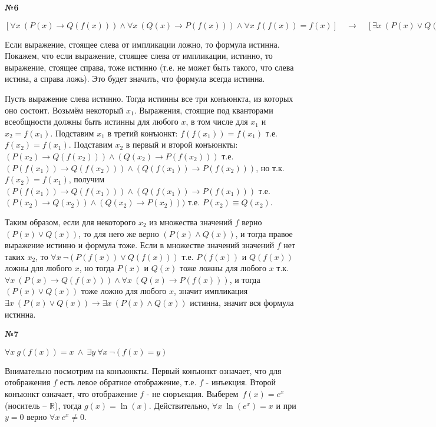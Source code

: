 \documentclass{article}
\newenvironment{task}{\begin{center}\fontsize{14}{14}\selectfont\bf}{\rm\fontsize{12}{12}\selectfont\end{center}}
\begin{document}
	
			
	\begin{task} 
		№6
	\end{task}
	\begin{center}
		$\left[ \forall x\ (P(x) \rightarrow Q(f(x))) \wedge \forall x\ (Q(x) \rightarrow P(f(x))) \wedge \forall x\ f(f(x)) = f(x) \right] \quad \rightarrow \quad \left[ \exists x\ (P(x) \vee Q(x)) \rightarrow \exists x\ (P(x) \wedge Q(x)) \right]$
	\end{center}

	Если выражение, стоящее слева от импликации ложно, то формула истинна. Покажем, что если выражение, стоящее слева от импликации, истинно, то выражение, стоящее справа, тоже истинно (т.е. не может быть такого, что слева истина, а справа ложь). Это будет значить, что формула всегда истинна.
	
	Пусть выражение слева истинно. Тогда истинны все три конъюнкта, из которых оно состоит. Возьмём некоторый $x_1$. Выражения, стоящие под кванторами всеобщности должны быть истинны для любого $x$, в том числе для $x_1$ и $x_2 = f(x_1)$. Подставим $x_1$ в третий конъюнкт: $f(f(x_1)) = f(x_1)$ т.е. $f(x_2) = f(x_1)$. Подставим $x_2$ в первый и второй конъюнкты:
	$(P(x_2) \rightarrow Q(f(x_2))) \wedge (Q(x_2) \rightarrow P(f(x_2)))$ т.е. $(P(f(x_1)) \rightarrow Q(f(x_2))) \wedge (Q(f(x_1)) \rightarrow P(f(x_2)))$, но т.к. $f(x_2) = f(x_1)$, получим $(P(f(x_1)) \rightarrow Q(f(x_1))) \wedge (Q(f(x_1)) \rightarrow P(f(x_1)))$ т.е. $(P(x_2) \rightarrow Q(x_2)) \wedge (Q(x_2) \rightarrow P(x_2)))$ т.е. $P(x_2) \equiv Q(x_2)$.
	
	Таким образом, если для некоторого $x_2$ из множества значений $f$ верно $(P(x) \vee Q(x))$, то для него же верно $(P(x) \wedge Q(x))$, и тогда правое выражение истинно и формула тоже. Если в множестве значений значений $f$ нет таких $x_2$, то $\forall x\ \neg (P(f(x)) \vee Q(f(x)))$ т.е. $P(f(x))$ и $Q(f(x))$ ложны для любого $x$, но тогда $P(x)$ и $Q(x)$ тоже ложны для любого $x$ т.к. $\forall x\ (P(x) \rightarrow Q(f(x))) \wedge \forall x\ (Q(x) \rightarrow P(f(x)))$, и тогда $(P(x) \vee Q(x))$ тоже ложно для любого $x$, значит импликация $\exists x\ (P(x) \vee Q(x)) \rightarrow \exists x\ (P(x) \wedge Q(x))$ истинна, значит вся формула истинна.
	


	\begin{task} 
		№7
	\end{task}
	\begin{center}
		$\forall x\ g(f(x)) = x\ \wedge \ \exists y\ \forall x\ \neg(f(x) = y)$
	\end{center}
	Внимательно посмотрим на конъюнкты. Первый конъюнкт означает, что для отображения $f$ есть левое обратное отображение, т.е. $f$ - инъекция. Второй конъюнкт означает, что отображение $f$ - не сюръекция. Выберем\ $f(x) = e^x$ (носитель -- $\mathbb{R}$), тогда $g(x) = \ln(x)$. Действительно, $\forall x\ \ln(e^x) = x$ и при $y = 0$ верно $\forall x\ e^x \not= 0$. 
	
\end{document}
